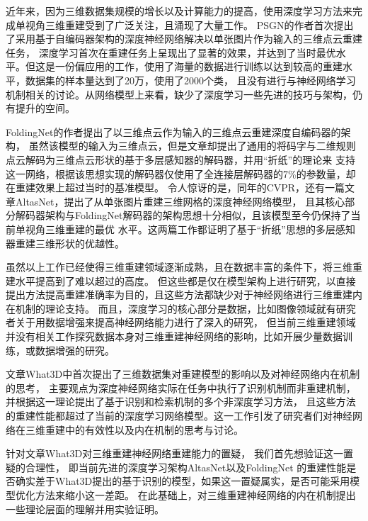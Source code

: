 \documentclass[bachelor, nocolorlinks, printoneside]{seuthesis} %
\begin{document}
\begin{Main}
近年来，因为三维数据集规模的增长以及计算能力的提高，使用深度学习方法来完成单视角三维重建受到了广泛关注，且涌现了大量工作。
PSGN\cite{fan2017point}的作者首次提出了采用基于自编码器架构的深度神经网络解决以单张图片作为输入的三维点云重建任务，
深度学习首次在重建任务上呈现出了显著的效果，并达到了当时最优水平。但这是一份偏应用的工作，使用了海量的数据进行训练以达到较高的重建水平，数据集的样本量达到了20万，使用了2000个类，
且没有进行与神经网络学习机制相关的讨论。从网络模型上来看，缺少了深度学习一些先进的技巧与架构，仍有提升的空间。

FoldingNet\cite{yang2018foldingnet}的作者提出了以三维点云作为输入的三维点云重建深度自编码器的架构，
虽然该模型的输入为三维点云，但是文章却提出了通用的将码字与二维规则点云解码为三维点云形状的基于多层感知器的解码器，并用“折纸”的理论来
支持这一网络，根据该思想实现的解码器仅使用了全连接层解码器的7\%的参数量，却在重建效果上超过当时的基准模型。
令人惊讶的是，同年的CVPR，还有一篇文章AltasNet\cite{Groueix_2018}，提出了从单张图片重建三维网格的深度神经网络模型，
且其核心部分解码器架构与FoldingNet\cite{yang2018foldingnet}解码器的架构思想十分相似，且该模型至今仍保持了当前单视角三维重建的最优
水平。这两篇工作都证明了基于“折纸”思想的多层感知器重建三维形状的优越性。

虽然以上工作已经使得三维重建领域逐渐成熟，且在数据丰富的条件下，将三维重建水平提高到了难以超过的高度。
但这些都是仅在模型架构上进行研究，以直接提出方法提高重建准确率为目的，且这些方法都缺少对于神经网络进行三维重建内在机制的理论支持。
而且，深度学习的核心部分是数据，比如图像领域就有研究者关于用数据增强来提高神经网络能力进行了深入的研究，
但当前三维重建领域并没有相关工作探究数据本身对三维重建神经网络的影响，比如开展少量数据训练，或数据增强的研究。

文章What3D\cite{tatarchenko2019single}中首次提出了三维数据集对重建模型的影响以及对神经网络内在机制的思考，
主要观点为深度神经网络实际在任务中执行了识别机制而非重建机制，并根据这一理论提出了基于识别和检索机制的多个非深度学习方法，
且这些方法的重建性能都超过了当前的深度学习网络模型。这一工作引发了研究者们对神经网络在三维重建中的有效性以及内在机制的思考与讨论。

针对文章What3D\cite{tatarchenko2019single}对三维重建神经网络重建能力的置疑，
我们首先想验证这一置疑的合理性，
即当前先进的深度学习架构AltasNet\cite{Groueix_2018}以及FoldingNet\cite{yang2018foldingnet}
的重建性能是否确实差于What3D\cite{tatarchenko2019single}提出的基于识别的模型，如果这一置疑属实，是否可能采用模型优化方法来缩小这一差距。
在此基础上，对三维重建神经网络的内在机制提出一些理论层面的理解并用实验证明。


\end{Main}
\end{document}
